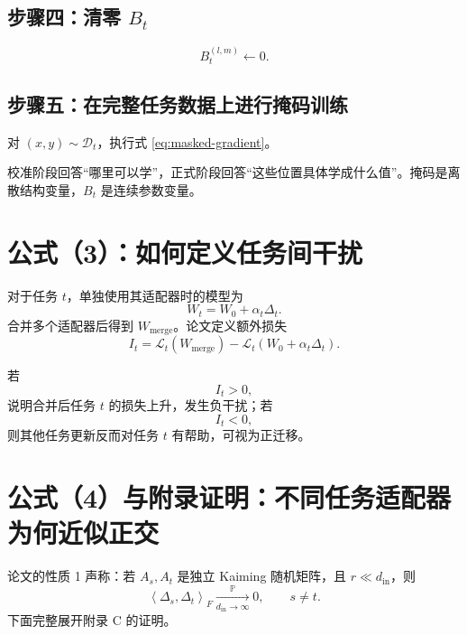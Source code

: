 \documentclass[UTF8,12pt,a4paper,fontset=none]{ctexart}
\numberwithin{equation}{section}
\newcommand{\Prob}{\mathbb{P}}
\newcommand{\ip}[2]{\left\langle #1,#2\right\rangle_F}
\newcommand{\Loss}{\mathcal{L}}
\newcommand{\Dt}{\mathcal{D}_t}
\begin{document}
\subsection{步骤四：清零 \texorpdfstring{$B_t$}{B t}}

\begin{equation}
  B_t^{(l,m)}\leftarrow 0.
\end{equation}

\subsection{步骤五：在完整任务数据上进行掩码训练}

对 $(x,y)\sim\Dt$，执行式 \eqref{eq:masked-gradient}。

\begin{keybox}[算法本质]
校准阶段回答“哪里可以学”，正式阶段回答“这些位置具体学成什么值”。掩码是离散结构变量，$B_t$ 是连续参数变量。
\end{keybox}

\section{公式（3）：如何定义任务间干扰}

对于任务 $t$，单独使用其适配器时的模型为
\begin{equation}
  W_t=W_0+\alpha_t\Delta_t.
\end{equation}
合并多个适配器后得到 $W_{\mathrm{merge}}$。论文定义额外损失
\begin{equation}
  I_t
  =\Loss_t(W_{\mathrm{merge}})
  -\Loss_t(W_0+\alpha_t\Delta_t).
  \tag{3}
  \label{eq:paper3}
\end{equation}

若
\begin{equation}
  I_t>0,
\end{equation}
说明合并后任务 $t$ 的损失上升，发生负干扰；若
\begin{equation}
  I_t<0,
\end{equation}
则其他任务更新反而对任务 $t$ 有帮助，可视为正迁移。

\section{公式（4）与附录证明：不同任务适配器为何近似正交}

论文的性质 1 声称：若 $A_s,A_t$ 是独立 Kaiming 随机矩阵，且 $r\ll d_{\mathrm{in}}$，则
\begin{equation}
  \ip{\Delta_s}{\Delta_t}
  \xrightarrow[d_{\mathrm{in}}\to\infty]{\Prob}0,
  \qquad s\neq t.
  \tag{4}
  \label{eq:paper4}
\end{equation}
下面完整展开附录 C 的证明。
\end{document}
